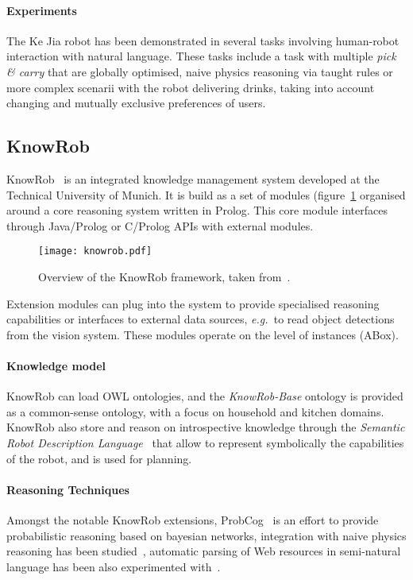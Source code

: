 \documentclass{IEEEtran}
\newcommand{\eg}{{\textit{e.g.\ }}}
\begin{document}
\paragraph{Experiments} The Ke Jia robot has been demonstrated in several tasks
involving human-robot interaction with natural language. These tasks include a
task with multiple \emph{pick \& carry} that are globally optimised, naive
physics reasoning via taught rules or more complex scenarii with the robot
delivering drinks, taking into account changing and mutually exclusive
preferences of users.


\subsection{KnowRob}
\label{sect|knowrob}


{\sc KnowRob}~\cite{Tenorth2009a} is an integrated knowledge management system
developed at the Technical University of Munich. It is build as a set of
modules (figure~\ref{fig|knowrob} organised around a core reasoning system
written in Prolog. This core module interfaces through Java/Prolog or
C/Prolog APIs with external modules.

\begin{figure}
    \centering
    \texttt{[image: knowrob.pdf]}

    \caption{Overview of the {\sc KnowRob} framework, taken
    from~\cite{Tenorth2011}.}

    \label{fig|knowrob}
\end{figure}

Extension modules can plug into the system to provide specialised reasoning
capabilities or interfaces to external data sources, \eg to read object
detections from the vision system. These modules operate on the level of
instances (ABox).

\paragraph{Knowledge model} {\sc KnowRob} can load OWL ontologies, and the
\emph{KnowRob-Base} ontology is provided as a common-sense ontology, with a
focus on household and kitchen domains. {\sc KnowRob} also store and reason on
introspective knowledge through the \emph{Semantic Robot Description
Language}~\cite{Kunze2011} that allow to represent symbolically the
capabilities of the robot, and is used for planning.


\paragraph{Reasoning Techniques} Amongst the notable {\sc KnowRob} extensions,
{\sc ProbCog}~\cite{Jain2009} is an effort to provide probabilistic reasoning
based on bayesian networks, integration with naive physics reasoning has been
studied~\cite{Kunze2011a}, automatic parsing of Web resources in semi-natural
language has been also experimented with~\cite{Nyga2009}.
\end{document}
